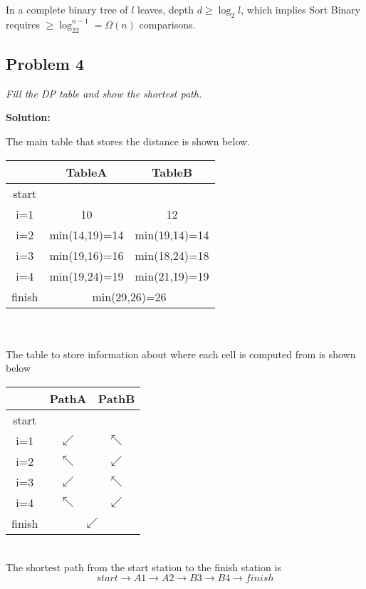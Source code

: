 \documentclass[12pt,a4paper]{article}
\newcommand{\solution}{\noindent\textbf{Solution:}\\\indent}
\begin{document}
In a complete binary tree of $l$ leaves, depth $d \geq \log_2l$, which implies Sort Binary requires $\geq \log_22^{n-1} = \Omega(n)$ comparisons.

\newpage
\subsection*{Problem 4}
\textit{
    Fill the DP table and show the shortest path.
}

\solution

The main table that stores the distance is shown below. \\

\begin{tabular}{|c|c|c|}
\hline
& TableA & TableB \\
\hline
start & \multicolumn{2}{c|}{} \\
\hline
i=1 & 10 & 12 \\
\hline
i=2 & min(14,19)=14 & min(19,14)=14 \\
\hline
i=3 & min(19,16)=16 & min(18,24)=18 \\
\hline
i=4 & min(19,24)=19 & min(21,19)=19 \\
\hline
finish & \multicolumn{2}{c|}{min(29,26)=26} \\
\hline
\end{tabular} \\ \\

The table to store information about where each cell is computed from is shown below \\

\begin{tabular}{|c|c|c|}
\hline
& PathA & PathB \\
\hline
start & \multicolumn{2}{c|}{} \\
\hline
i=1 & $\swarrow$ & $\nwarrow$ \\
\hline
i=2 & $\nwarrow$ & $\swarrow$ \\
\hline
i=3 & $\swarrow$ & $\nwarrow$ \\
\hline
i=4 & $\nwarrow$ & $\swarrow$ \\
\hline
finish & \multicolumn{2}{c|}{$\swarrow$} \\
\hline
\end{tabular} \\

The shortest path from the start station to the finish station is
\begin{equation}
    start \rightarrow A1 \rightarrow A2 \rightarrow B3 \rightarrow B4 \rightarrow finish
\end{equation}
\end{document}
